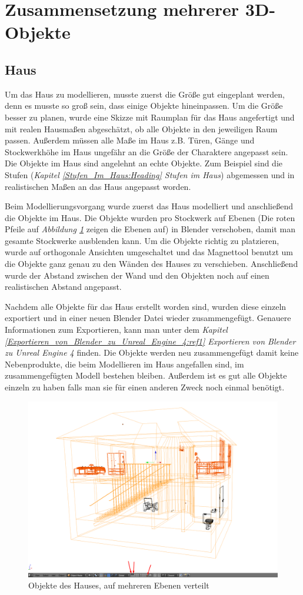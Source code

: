 \section{Zusammensetzung mehrerer 3D-Objekte}
\subsection{Haus}
\label{haus:ref1}
Um das Haus zu modellieren, musste zuerst die Größe gut eingeplant werden, denn es musste so groß sein, dass einige Objekte hineinpassen.
Um die Größe besser zu planen, wurde eine Skizze mit Raumplan für das Haus angefertigt und mit realen Hausmaßen abgeschätzt, ob alle Objekte in den jeweiligen Raum passen.
Außerdem müssen alle Maße im Haus z.B. Türen, Gänge und Stockwerkhöhe im Haus ungefähr an die Größe der Charaktere angepasst sein.
Die Objekte im Haus sind angelehnt an echte Objekte. Zum Beispiel sind die Stufen (\textit{Kapitel \ref{Stufen_Im_Haus:Heading} \dq Stufen im Haus\dq})
abgemessen und in realistischen Maßen an das Haus angepasst worden.

Beim Modellierungsvorgang wurde zuerst das Haus modelliert und anschließend die Objekte im Haus. Die Objekte wurden pro Stockwerk auf Ebenen (Die roten Pfeile auf \textit{Abbildung \ref{Haus:image1}} zeigen
die Ebenen auf) in Blender verschoben, damit man gesamte Stockwerke ausblenden kann. Um die Objekte richtig zu platzieren, wurde auf orthogonale Ansichten umgeschaltet
und das Magnettool benutzt um die Objekte ganz genau zu den Wänden des Hauses zu verschieben. Anschließend wurde der Abstand zwischen der Wand und den Objekten
noch auf einen realistischen Abstand angepasst.

Nachdem alle Objekte für das Haus erstellt worden sind, wurden diese einzeln exportiert und in einer neuen Blender Datei wieder zusammengefügt. Genauere Informationen zum Exportieren, kann
man unter dem \textit{Kapitel \ref{Exportieren_von_Blender_zu_Unreal_Engine_4:ref1} \dq Exportieren von Blender zu Unreal Engine 4\dq} finden. Die Objekte werden neu zusammengefügt damit keine Nebenprodukte, die beim Modellieren
im Haus angefallen sind, im zusammengefügten Modell bestehen bleiben. Außerdem ist es gut alle Objekte einzeln zu haben falls man sie für einen anderen Zweck noch einmal benötigt.

\begin{figure}[h]
    \centering
    \includegraphics[width=.8\textwidth]{images/Haus-zusammenfuegen_Ebenen.png}
    \caption{Objekte des Hauses, auf mehreren Ebenen verteilt}
    \label{Haus:image1}
\end{figure}
